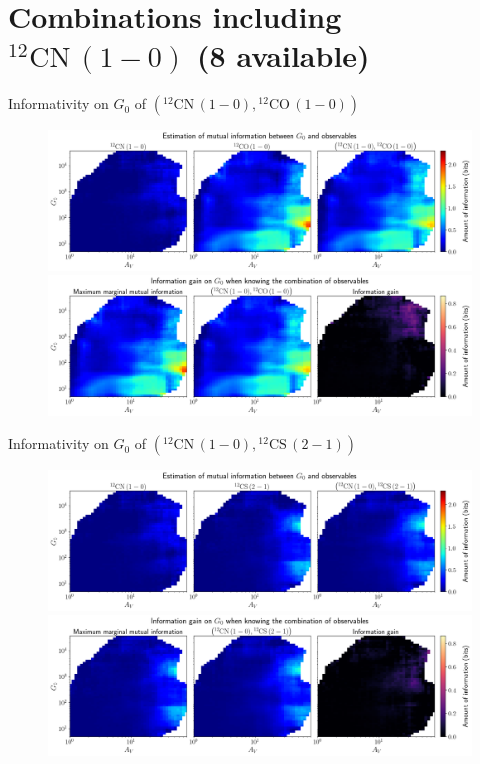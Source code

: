 \documentclass{beamer}
\begin{document}
\section{Combinations including $\mathrm{^{12}CN\,(1-0)}$ (8 available)}

\begin{frame}{Informativity on $G_0$ of $\left(\mathrm{^{12}CN\,(1-0)},\mathrm{^{12}CO\,(1-0)}\right)$}
    \begin{figure}
        \centering
        \includegraphics[width=0.95\linewidth]{../mi/g0__12cn10_12co10_mi.png}
        \vfill
        \includegraphics[width=0.95\linewidth]{../mi/g0__12cn10_12co10_mi_gain.png}
    \end{figure}
\end{frame}

\begin{frame}{Informativity on $G_0$ of $\left(\mathrm{^{12}CN\,(1-0)},\mathrm{^{12}CS\,(2-1)}\right)$}
    \begin{figure}
        \centering
        \includegraphics[width=0.95\linewidth]{../mi/g0__12cn10_12cs21_mi.png}
        \vfill
        \includegraphics[width=0.95\linewidth]{../mi/g0__12cn10_12cs21_mi_gain.png}
    \end{figure}
\end{frame}
\end{document}
